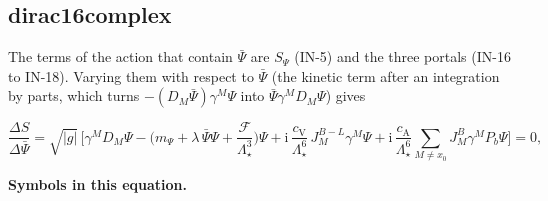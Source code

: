 \documentclass[
  10pt,
]{article}
\begin{document}
\hypertarget{dirac16complex}{%
\subsection{dirac16complex}\label{dirac16complex}}

The terms of the action that contain \(\bar\Psi\) are \(S_\Psi\) (IN-5)
and the three portals (IN-16 to IN-18). Varying them with respect to
\(\bar\Psi\) (the kinetic term after an integration by parts, which
turns \(-(D_M\bar\Psi)\gamma^M\Psi\) into \(\bar\Psi\gamma^MD_M\Psi\))
gives

\[
\frac{\Delta S}{\Delta\bar\Psi} = \sqrt{\lvert g\rvert}\,\Big[\gamma^MD_M\Psi - \Big(m_\Psi + \lambda\,\bar\Psi\Psi
 + \frac{\mathcal{F}}{\Lambda_\star^3}\Big)\Psi + \mathrm{i}\,\frac{c_{\mathrm{V}}}{\Lambda_\star^6}\,J^{B-L}_M\gamma^M\Psi
 + \mathrm{i}\,\frac{c_{\mathrm{A}}}{\Lambda_\star^6}\sum_{M\ne x_0}J^{B}_M\gamma^MP_b\Psi\Big] = 0,
\]

\textbf{Symbols in this equation.}
\end{document}
